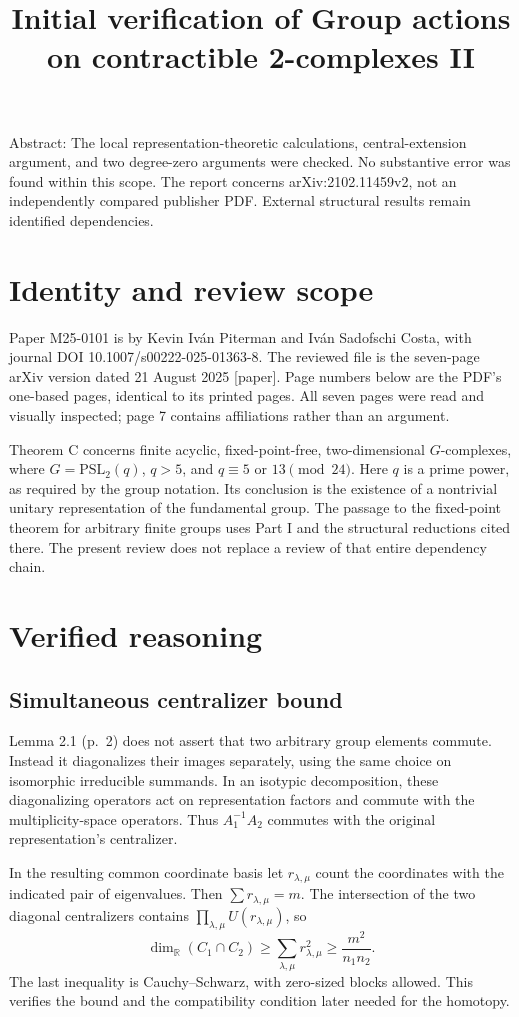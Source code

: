\documentclass[10pt]{article}
\title{Initial verification of
Group actions on contractible 2-complexes II}
\author{}
\date{}
\begin{document}
\maketitle
Abstract: The local representation-theoretic calculations, central-extension argument, and two degree-zero arguments were checked. No substantive error was found within this scope. The report concerns arXiv:2102.11459v2, not an independently compared publisher PDF. External structural results remain identified dependencies.\par
\section*{Identity and review scope}
Paper M25-0101 is by Kevin Iván Piterman and Iván Sadofschi Costa, with journal DOI 10.1007/s00222-025-01363-8. The reviewed file is the seven-page arXiv version dated 21 August 2025 [paper]. Page numbers below are the PDF’s one-based pages, identical to its printed pages. All seven pages were read and visually inspected; page 7 contains affiliations rather than an argument.\par
Theorem C concerns finite acyclic, fixed-point-free, two-dimensional \(G\)-complexes, where \(G=\mathrm{PSL}_2(q)\), \(q>5\), and \(q\equiv5\) or \(13\pmod {24}\). Here \(q\) is a prime power, as required by the group notation. Its conclusion is the existence of a nontrivial unitary representation of the fundamental group. The passage to the fixed-point theorem for arbitrary finite groups uses Part I and the structural reductions cited there. The present review does not replace a review of that entire dependency chain.\par
\section*{Verified reasoning}
\subsection*{Simultaneous centralizer bound}
Lemma 2.1 (p. 2) does not assert that two arbitrary group elements commute. Instead it diagonalizes their images separately, using the same choice on isomorphic irreducible summands. In an isotypic decomposition, these diagonalizing operators act on representation factors and commute with the multiplicity-space operators. Thus \(A_1^{-1}A_2\) commutes with the original representation’s centralizer.\par
In the resulting common coordinate basis let \(r_{\lambda,\mu}\) count the coordinates with the indicated pair of eigenvalues. Then \(\sum r_{\lambda,\mu}=m\). The intersection of the two diagonal centralizers contains \(\prod_{\lambda,\mu}U(r_{\lambda,\mu})\), so \[\dim_{\mathbb R}(C_1\cap C_2)\geq\sum_{\lambda,\mu}r_{\lambda,\mu}^2
 \geq\frac{m^2}{n_1n_2}.\] The last inequality is Cauchy–Schwarz, with zero-sized blocks allowed. This verifies the bound and the compatibility condition later needed for the homotopy.\par
\end{document}
